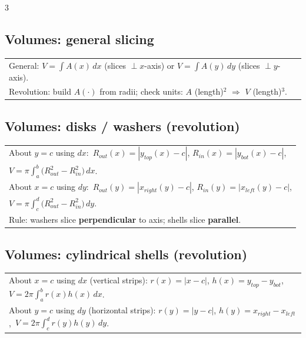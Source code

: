 \documentclass[10pt]{article}
\newcommand{\dx}{\,dx}
\newcommand{\dy}{\,dy}
\begin{document}
\begin{multicols}{3}
\subsection*{Volumes: general slicing}
\vspace{-1pt}
\begin{tabular}{@{}p{}@{}}
General: $V=\int A(x)\dx$ (slices $\perp x$-axis) or $V=\int A(y)\dy$ (slices $\perp y$-axis).\\
Revolution: build $A(\cdot)$ from radii; check units: $A$ (length)$^2$ $\Rightarrow$ $V$ (length)$^3$.\\
\end{tabular}

\subsection*{Volumes: disks / washers (revolution)}
\vspace{-1pt}
\begin{tabular}{@{}p{}@{}}
About $y=c$ using $dx$:\ $R_{out}(x)=|y_{top}(x)-c|$, $R_{in}(x)=|y_{bot}(x)-c|$,\\
\hspace*{1.2em}$V=\pi\int_a^b\big(R_{out}^2-R_{in}^2\big)\dx$.\\
About $x=c$ using $dy$:\ $R_{out}(y)=|x_{right}(y)-c|$, $R_{in}(y)=|x_{left}(y)-c|$,\\
\hspace*{1.2em}$V=\pi\int_c^d\big(R_{out}^2-R_{in}^2\big)\dy$.\\
Rule: washers slice \textbf{perpendicular} to axis; shells slice \textbf{parallel}.\\
\end{tabular}

\subsection*{Volumes: cylindrical shells (revolution)}
\vspace{-1pt}
\begin{tabular}{@{}p{}@{}}
About $x=c$ using $dx$ (vertical strips): $r(x)=|x-c|$, $h(x)=y_{top}-y_{bot}$,\ $V=2\pi\int_a^b r(x)h(x)\dx$.\\
About $y=c$ using $dy$ (horizontal strips): $r(y)=|y-c|$, $h(y)=x_{right}-x_{left}$,\ $V=2\pi\int_c^d r(y)h(y)\dy$.\\
\end{tabular}


\end{multicols}
\end{document}
